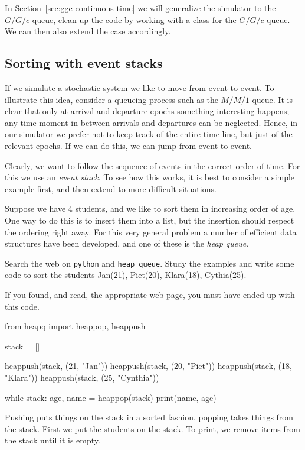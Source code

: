 \documentclass{scrartcl}
\begin{document}
In Section~\ref{sec:ggc-continuous-time} we will generalize the simulator to the $G/G/c$ queue, clean up the code by working with a class for the $G/G/c$ queue. We can then also extend the case accordingly. 


\subsection{Sorting with event stacks}
\label{sec:event-stacks}

If we simulate a stochastic system we like to move from event to event.
To illustrate this idea, consider a queueing process such as the $M/M/1$ queue.
It is clear that only at arrival and departure epochs something interesting happens; any time moment in between arrivals and departures can be neglected.
Hence, in our simulator we prefer not to keep track of the entire time line, but just of the relevant epochs.
If we can do this, we can jump from event to event.

Clearly, we want to follow the sequence of events in the correct order of time.
For this we use an \emph{event stack}.
To see how this works, it is best to consider a simple example first, and then extend to more difficult situations.

Suppose we have 4 students, and we like to sort them in increasing order of age.
One way to do this is to insert them into a list, but the insertion should respect the ordering right away.
For this very general problem a number of efficient data structures have been developed, and one of these is the \emph{heap queue}.

\begin{exercise}
  Search the web on \texttt{python} and \texttt{heap queue}. Study the examples and write some code to sort the students Jan(21), Piet(20), Klara(18), Cythia(25).

  \begin{solution}
If you found, and read, the appropriate web page, you must have ended up with this code.
\begin{pyblock}
from heapq import heappop, heappush

stack = []

heappush(stack, (21, "Jan"))
heappush(stack, (20, "Piet"))
heappush(stack, (18, "Klara"))
heappush(stack, (25, "Cynthia"))

while stack:
    age, name = heappop(stack)
    print(name, age)

  \end{pyblock}

Pushing puts things on the stack in a sorted fashion, popping takes things from the stack. First we put the students on the stack. To print, we remove items from the stack until it is empty.
\end{solution}
  
\end{exercise}
\end{document}
